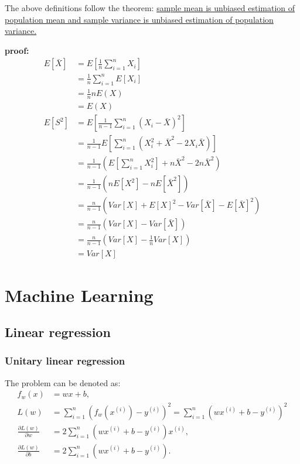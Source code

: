 \documentclass[10pt,onecolumn]{book}
\begin{document}
The above definitions follow the theorem: \uline{sample mean is unbiased estimation of population mean and sample variance is unbiased estimation of population variance.}　

\textbf{proof:}
\begin{equation}\label{eq:unbiased_estimation_of_sample_mean_and_variance}
\begin{split}
E[\bar{X}] &= E[\frac{1}{n} \sum_{i=1}^n X_i] \\
			&= \frac{1}{n} \sum_{i=1}^n E[X_i] \\
			&= \frac{1}{n} n E(X) \\
			&= E(X) \\
E[S^2] &= E[\frac{1}{n - 1} \sum_{i=1}^n(X_i - \bar{X})^2] \\
		&= \frac{1}{n-1}E[\sum_{i=1}^n(X_i ^ 2 + \bar{X} ^ 2 - 2 X_i \bar{X})] \\
		&= \frac{1}{n-1}(E[\sum_{i=1}^nX_i ^ 2] + n\bar{X}^2 - 2n\bar{X}^2) \\
		&= \frac{1}{n-1}(nE[X ^ 2] - nE[\bar{X}^2]) \\
		&= \frac{n}{n-1}(Var[X] + E[X]^2 - Var[\bar{X}] - E[\bar{X}]^2) \\
		&= \frac{n}{n-1}(Var[X] - Var[\bar{X}]) \\
		&= \frac{n}{n-1}(Var[X] - \frac{1}{n}Var[X]) \\
		&= Var[X]
\end{split}
\end{equation}

\chapter{Machine Learning}
\section{Linear regression}
\subsection{Unitary linear regression}
The problem can be denoted as:
\begin{equation}
\begin{split}
f_w(x) &= wx + b, \\
L(w) &= \sum_{i = 1}^n (f_w(x^{(i)}) - y^{(i)})^2 = \sum_{i = 1}^n (wx^{(i)} + b - y^{(i)})^2 \\
\frac{\partial L(w)}{\partial w} &= 2\sum_{i=1}^n (wx^{(i)} + b - y^{(i)}) x^{(i)} , \\
\frac{\partial L(w)}{\partial b} &= 2 \sum_{i = 1}^n (wx^{(i)} + b - y^{(i)}).
\end{split}
\end{equation}
\end{document}

